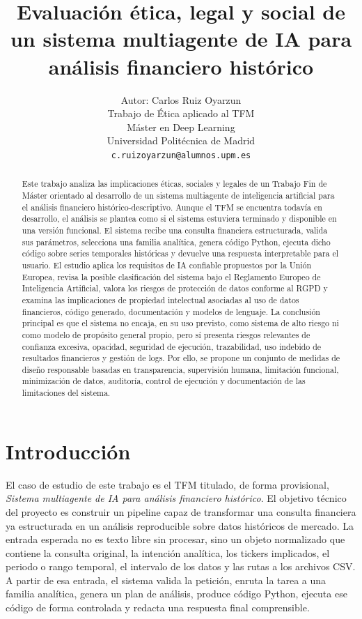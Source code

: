 \documentclass{article}
\title{Evaluación ética, legal y social de un sistema multiagente de IA para análisis financiero histórico}
\author{
  Autor: Carlos Ruiz Oyarzun \\
  Trabajo de Ética aplicado al TFM \\
  Máster en Deep Learning \\
  Universidad Politécnica de Madrid \\
  \texttt{c.ruizoyarzun@alumnos.upm.es}
}
\begin{document}
\maketitle

\begin{abstract}
Este trabajo analiza las implicaciones éticas, sociales y legales de un Trabajo Fin de Máster orientado al desarrollo de un sistema multiagente de inteligencia artificial para el análisis financiero histórico-descriptivo. Aunque el TFM se encuentra todavía en desarrollo, el análisis se plantea como si el sistema estuviera terminado y disponible en una versión funcional. El sistema recibe una consulta financiera estructurada, valida sus parámetros, selecciona una familia analítica, genera código Python, ejecuta dicho código sobre series temporales históricas y devuelve una respuesta interpretable para el usuario. El estudio aplica los requisitos de IA confiable propuestos por la Unión Europea, revisa la posible clasificación del sistema bajo el Reglamento Europeo de Inteligencia Artificial, valora los riesgos de protección de datos conforme al RGPD y examina las implicaciones de propiedad intelectual asociadas al uso de datos financieros, código generado, documentación y modelos de lenguaje. La conclusión principal es que el sistema no encaja, en su uso previsto, como sistema de alto riesgo ni como modelo de propósito general propio, pero sí presenta riesgos relevantes de confianza excesiva, opacidad, seguridad de ejecución, trazabilidad, uso indebido de resultados financieros y gestión de logs. Por ello, se propone un conjunto de medidas de diseño responsable basadas en transparencia, supervisión humana, limitación funcional, minimización de datos, auditoría, control de ejecución y documentación de las limitaciones del sistema.
\end{abstract}


\section{Introducción}

El caso de estudio de este trabajo es el TFM titulado, de forma provisional, \textit{Sistema multiagente de IA para análisis financiero histórico}. El objetivo técnico del proyecto es construir un pipeline capaz de transformar una consulta financiera ya estructurada en un análisis reproducible sobre datos históricos de mercado. La entrada esperada no es texto libre sin procesar, sino un objeto normalizado que contiene la consulta original, la intención analítica, los tickers implicados, el periodo o rango temporal, el intervalo de los datos y las rutas a los archivos CSV. A partir de esa entrada, el sistema valida la petición, enruta la tarea a una familia analítica, genera un plan de análisis, produce código Python, ejecuta ese código de forma controlada y redacta una respuesta final comprensible.
\end{document}
